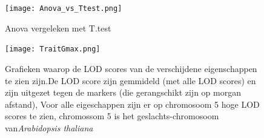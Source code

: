 \documentclass[12pt,a4paper]{article}
\begin{document}
\pagebreak

\listoffigures
\pagebreak

\begin{figure}
\vspace{-6cm}
\hspace{-1.5cm}
\texttt{[image: Anova\_vs\_Ttest.png]}
\caption{Anova vergeleken met T.test}
\FloatBarrier
\end{figure}


\begin{figure}
\vspace{-1.5cm}
\hspace{-2cm}
\texttt{[image: TraitGmax.png]}
\quad\
\caption[LOD scores per eigenschap]{Grafieken waarop de LOD scores van de verschijdene eigenschappen te zien zijn.De LOD score zijn gemmideld (met alle LOD scores) en zijn uitgezet tegen de markers (die gerangschikt zijn op morgan afstand), Voor alle eigeschappen zijn er op chromosoom 5  hoge LOD scores te zien, chromossom 5  is het geslachts-chromosoom van\textit{Arabidopsis thaliana}}
\end{figure}
\end{document}

